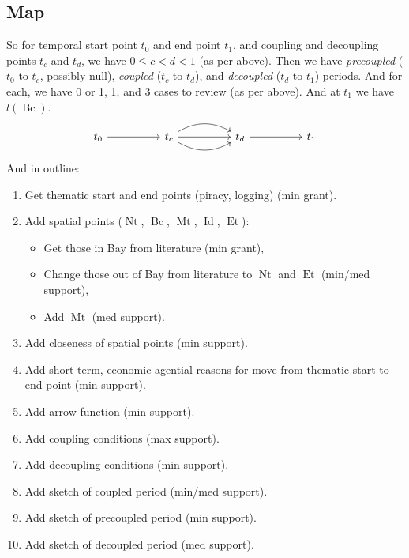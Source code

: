 \documentclass{amsart}
\newcommand{\mention}[1]{\textit{#1}}%
\DeclareMathOperator{\id}{Id}%
\DeclareMathOperator{\mt}{Mt}%
\DeclareMathOperator{\bc}{Bc}%
\DeclareMathOperator{\et}{Et}%
\DeclareMathOperator{\nt}{Nt}%
\theoremstyle{definition}%
\theoremstyle{definition}%
\theoremstyle{remark}%
\theoremstyle{definition}%
\theoremstyle{definition}%
\begin{document}
\subsection{Map}
\label{ss:map}
So for temporal start point \(t_{0}\) and end point \(t_{1}\), and coupling and decoupling points \(t_{c}\) and \(t_{d}\), we have \(0\leq c<d< 1\) (as per above). %
Then we have \mention{precoupled} (\(t_{0}\) to \(t_{c}\), possibly null), \mention{coupled} (\(t_{c}\) to \(t_{d}\)), and \mention{decoupled} (\(t_{d}\) to \(t_{1}\)) periods. And for each, we have 0 or 1, 1, and 3 cases to review (as per above). And at \(t_{1}\) we have \(l(\bc)\).
%
\begin{equation}
\label{}
\begin{tikzcd}[sep=huge]
t_{0} \rar &t_{c} \rar \rar[bend left] \rar[bend right] &t_{d} \rar &t_{1}
\end{tikzcd}
\end{equation}
%
And in outline:
\begin{enumerate}
\item Get thematic start and end points (piracy, logging) (min grant).
\item Add spatial points (\(\nt\), \(\bc\), \(\mt\), \(\id\), \(\et\)):
	\begin{itemize}
	\item Get those in Bay from literature (min grant),
	\item Change those out of Bay from literature to \(\nt\) and \(\et\) (min/med support),%
	\item Add \(\mt\) (med support).
	\end{itemize}
\item Add closeness of spatial points (min support).
\item Add short-term, economic agential reasons for move from thematic start to end point (min support).
\item Add arrow function (min support).%
\item Add coupling conditions (max support).%
\item Add decoupling conditions (min support).
\item Add sketch of coupled period (min/med support).
\item Add sketch of precoupled period (min support).
\item Add sketch of decoupled period (med support).
\end{enumerate}
%
%
\end{document}
